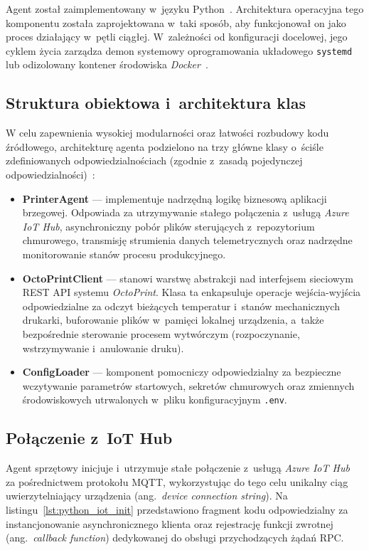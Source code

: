 \documentclass[a4paper,12pt,reqno]{article}
\begin{document}
Agent został zaimplementowany w~języku Python~\cite{python}. Architektura operacyjna tego komponentu została zaprojektowana w~taki sposób, aby funkcjonował on jako proces działający w~pętli ciągłej. W~zależności od konfiguracji docelowej, jego cyklem życia zarządza demon systemowy oprogramowania układowego \texttt{systemd} lub odizolowany kontener środowiska \textit{Docker}~\cite{docker}.

\subsection{Struktura obiektowa i~architektura klas}

W celu zapewnienia wysokiej modularności oraz łatwości rozbudowy kodu źródłowego, architekturę agenta podzielono na trzy główne klasy o~ściśle zdefiniowanych odpowiedzialnościach (zgodnie z~zasadą pojedynczej odpowiedzialności)~\cite{martin2022}:

\begin{itemize}
	\item \textbf{PrinterAgent} --- implementuje nadrzędną logikę biznesową aplikacji brzegowej. Odpowiada za utrzymywanie stałego połączenia z~usługą \textit{Azure IoT Hub}, asynchroniczny pobór plików sterujących z~repozytorium chmurowego, transmisję strumienia danych telemetrycznych oraz nadrzędne monitorowanie stanów procesu produkcyjnego.
	
	\item \textbf{OctoPrintClient} --- stanowi warstwę abstrakcji nad interfejsem sieciowym REST API systemu \textit{OctoPrint}. Klasa ta enkapsuluje operacje wejścia-wyjścia odpowiedzialne za odczyt bieżących temperatur i~stanów mechanicznych drukarki, buforowanie plików w~pamięci lokalnej urządzenia, a~także bezpośrednie sterowanie procesem wytwórczym (rozpoczynanie, wstrzymywanie i~anulowanie druku).
	
	\item \textbf{ConfigLoader} --- komponent pomocniczy odpowiedzialny za bezpieczne wczytywanie parametrów startowych, sekretów chmurowych oraz zmiennych środowiskowych utrwalonych w~pliku konfiguracyjnym \texttt{.env}.
\end{itemize}

\subsection{Połączenie z~IoT Hub}

Agent sprzętowy inicjuje i~utrzymuje stałe połączenie z~usługą \textit{Azure IoT Hub}~\cite{iothub} za pośrednictwem protokołu MQTT, wykorzystując do tego celu unikalny ciąg uwierzytelniający urządzenia (ang.~\textit{device connection string}). Na listingu~\ref{lst:python_iot_init} przedstawiono fragment kodu odpowiedzialny za instancjonowanie asynchronicznego klienta oraz rejestrację funkcji zwrotnej (ang.~\textit{callback function}) dedykowanej do obsługi przychodzących żądań RPC.
\end{document}
